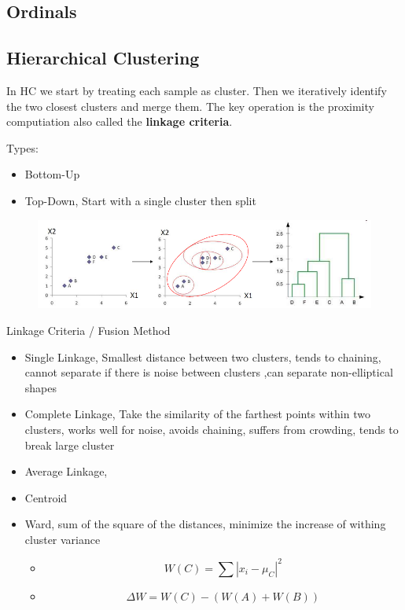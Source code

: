 \documentclass[../Main.tex]{subfiles}
\begin{document}
\subsection{Ordinals}

\subsection{Hierarchical Clustering}

In HC we start by treating each sample as cluster.
Then we iteratively identify the two closest clusters and merge them.
The key operation is the proximity computiation also called the \textbf{linkage criteria}.

Types:
\begin{itemize}
    \item Bottom-Up
    \item Top-Down, Start with a single cluster then split
\end{itemize}

\begin{figure}[H]
    \centering
    \includegraphics[width=0.75\linewidth]{Images/datan/hierarchical-clustering.png}
\end{figure}

Linkage Criteria / Fusion Method
\begin{itemize}
    \item Single Linkage, Smallest distance between two clusters, tends to chaining, cannot separate if there is noise between clusters ,can separate non-elliptical shapes
    \item Complete Linkage, Take the similarity of the farthest points within two clusters, works well for noise, avoids chaining, suffers from crowding, tends to break large cluster
    \item Average Linkage, 
    \item Centroid
    \item Ward, sum of the square of the distances, minimize the increase of withing cluster variance
    \begin{itemize}
        \item \begin{equation*}
            W(C) = \sum |x_i - \mu_C |^2
        \end{equation*}
        \item \begin{equation*}
            \Delta W = W(C) - (W(A) + W(B))
        \end{equation*}
    \end{itemize}
\end{itemize}
\end{document}
